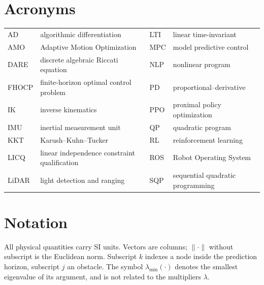 \documentclass[11pt,a4paper]{article}
\begin{document}


\tableofcontents
\vspace{10pt}

\section*{Acronyms}

\noindent\begin{tabularx}{\textwidth}{@{}lX@{\hspace{1.2em}}lX@{}}
AD    & algorithmic differentiation      & LTI   & linear time-invariant \\
AMO   & Adaptive Motion Optimization     & MPC   & model predictive control \\
DARE  & discrete algebraic Riccati equation & NLP & nonlinear program \\
FHOCP & finite-horizon optimal control problem & PD & proportional--derivative \\
IK    & inverse kinematics               & PPO   & proximal policy optimization \\
IMU   & inertial measurement unit        & QP    & quadratic program \\
KKT   & Karush--Kuhn--Tucker             & RL    & reinforcement learning \\
LICQ  & linear independence constraint qualification & ROS & Robot Operating System \\
LiDAR & light detection and ranging      & SQP   & sequential quadratic programming \\
\end{tabularx}

\section*{Notation}

\noindent All physical quantities carry SI units. Vectors are columns; $\|\cdot\|$ without
subscript is the Euclidean norm. Subscript $k$ indexes a node inside the prediction horizon,
subscript $j$ an obstacle. The symbol $\lambda_{\min}(\cdot)$ denotes the smallest eigenvalue of its
argument, and is not related to the multipliers $\lambda$.
\end{document}
